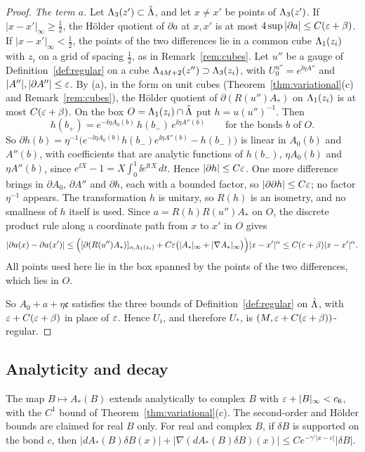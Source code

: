 \begin{proof}
\emph{The term $a$.} Let $\Lambda_3(z')\subset\hat{\Lambda}$, and let $x\ne x'$ be points of $\Lambda_3(z')$. If $|x-x'|_\infty\ge\frac12$, the H\"older quotient of $\partial a$ at $x,x'$ is at most $4\sup|\partial a|\le C(\varepsilon+\beta)$. If $|x-x'|_\infty<\frac12$, the points of the two differences lie in a common cube $\Lambda_1(z_i)$ with $z_i$ on a grid of spacing $\frac12$, as in Remark~\ref{rem:cubes}. Let $u''$ be a gauge of Definition~\ref{def:regular} on a cube $\Lambda_{4M+2}(z'')\supset\Lambda_3(z_i)$, with $U_0^{u''}=e^{\ii\eta A''}$ and $|A''|,|\partial A''|\le\varepsilon$. By (a), in the form on unit cubes (Theorem~\ref{thm:variational}(c) and Remark~\ref{rem:cubes}), the H\"older quotient of $\partial(R(u'')A_*)$ on $\Lambda_1(z_i)$ is at most $C(\varepsilon+\beta)$. On the box $O=\Lambda_1(z_i)\cap\hat{\Lambda}$ put $h=u(u'')^{-1}$. Then
\[
h(b_+)=e^{-\ii\eta A_0(b)}\,h(b_-)\,e^{\ii\eta A''(b)}\qquad\text{for the bonds }b\text{ of }O .
\]
So $\partial h(b)=\eta^{-1}\big(e^{-\ii\eta A_0(b)}h(b_-)e^{\ii\eta A''(b)}-h(b_-)\big)$ is linear in $A_0(b)$ and $A''(b)$, with coefficients that are analytic functions of $h(b_-)$, $\eta A_0(b)$ and $\eta A''(b)$, since $e^{\ii X}-1=X\int_0^1\ii e^{\ii tX}\,dt$. Hence $|\partial h|\le C\varepsilon$. One more difference brings in $\partial A_0$, $\partial A''$ and $\partial h$, each with a bounded factor, so $|\partial\partial h|\le C\varepsilon$; no factor $\eta^{-1}$ appears. The transformation $h$ is unitary, so $R(h)$ is an isometry, and no smallness of $h$ itself is used. Since $a=R(h)R(u'')A_*$ on $O$, the discrete product rule along a coordinate path from $x$ to $x'$ in $O$ gives
\[
|\partial a(x)-\partial a(x')|\le\Big([\partial(R(u'')A_*)]_{\alpha,\Lambda_1(z_i)}+C\varepsilon\big(|A_*|_\infty+|\nabla A_*|_\infty\big)\Big)|x-x'|^\alpha\le C(\varepsilon+\beta)|x-x'|^\alpha .
\]
All points used here lie in the box spanned by the points of the two differences, which lies in $O$.

So $A_0+a+\eta\mathfrak c$ satisfies the three bounds of Definition~\ref{def:regular} on $\hat{\Lambda}$, with $\varepsilon+C(\varepsilon+\beta)$ in place of $\varepsilon$. Hence $U_\flat$, and therefore $U_*$, is $(M,\varepsilon+C(\varepsilon+\beta))$-regular.
\end{proof}

\subsection{Analyticity and decay}

\begin{proposition}\label{prop:analyticity}
The map $B\mapsto A_*(B)$ extends analytically to complex $B$ with $\varepsilon+|B|_\infty<c_6$, with the $C^1$ bound of Theorem~\ref{thm:variational}(c). The second-order and H\"older bounds are claimed for real $B$ only. For real and complex $B$, if $\delta B$ is supported on the bond $c$, then $|dA_*(B)\delta B(x)|+|\nabla(dA_*(B)\delta B)(x)|\le Ce^{-\gamma'|x-c|}|\delta B|$.
\end{proposition}

